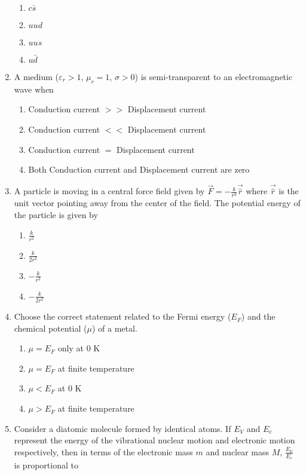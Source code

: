 \documentclass[journal]{IEEEtran}
\begin{document}
\begin{enumerate}
\begin{enumerate}
\item $c\bar{s}$
\item $uud$
\item $uus$
\item $u\bar{d}$
\end{enumerate}

\item A medium ($\varepsilon_{r}>1$, $\mu_{r}=1$, $\sigma>0$) is semi-transparent to an electromagnetic wave when

\begin{enumerate}
\item Conduction current $>>$ Displacement current
\item Conduction current $<<$ Displacement current
\item Conduction current $=$ Displacement current
\item Both Conduction current and Displacement current are zero
\end{enumerate}

\item A particle is moving in a central force field given by $\vec{F}=-\frac{k}{r^3}\vec{\hat{r}}$ where $\vec{\hat{r}}$ is the unit vector pointing away from the center of the field. The potential energy of the particle is given by

\begin{enumerate}
\item $\frac{k}{r^2}$
\item $\frac{k}{2r^2}$
\item $-\frac{k}{r^2}$
\item $-\frac{k}{2r^2}$
\end{enumerate}

\item Choose the correct statement related to the Fermi energy ($E_F$) and the chemical potential ($\mu$) of a metal.

\begin{enumerate}
\item $\mu=E_F$ only at $0$ K
\item $\mu=E_F$ at finite temperature
\item $\mu<E_F$ at $0$ K
\item $\mu>E_F$ at finite temperature
\end{enumerate}

\item Consider a diatomic molecule formed by identical atoms. If $E_V$ and $E_e$ represent the energy of the vibrational nuclear motion and electronic motion respectively, then in terms of the electronic mass $m$ and nuclear mass $M$, $\frac{E_V}{E_e}$ is proportional to


\end{enumerate}
\end{document}
